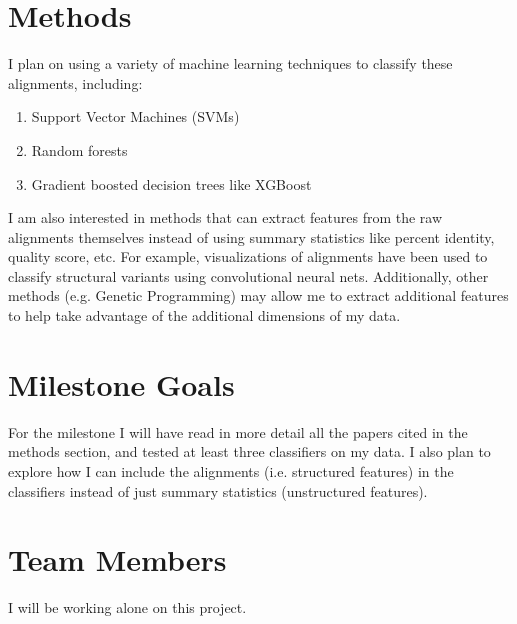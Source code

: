 \documentclass{article}
\begin{document}
\section*{Methods}
I plan on using a variety of machine learning techniques to classify these alignments, including: 
\begin{enumerate}
    \item Support Vector Machines (SVMs) \parencite{Hastie2008}
    \item Random forests \parencite{Ho1995, Breiman2001}
    \item Gradient boosted decision trees like XGBoost \parencite{Chen2016b} 
\end{enumerate}
I am also interested in methods that can extract features from the raw alignments themselves instead of using summary statistics like percent identity, quality score, etc. For example, visualizations of alignments have been used to classify structural variants using convolutional neural nets. Additionally, other methods (e.g. Genetic Programming) may allow me to extract additional features \parencite{Ahmed2014} to help take advantage of the additional dimensions of my data. 
 
\section*{Milestone Goals}
For the milestone I will have read in more detail all the papers cited in the methods section, and tested at least three classifiers on my data. I also plan to explore how I can include the alignments (i.e. structured features) in the classifiers instead of just summary statistics (unstructured features). 

\section*{Team Members}
I will be working alone on this project. 

\printbibliography 
\end{document}
